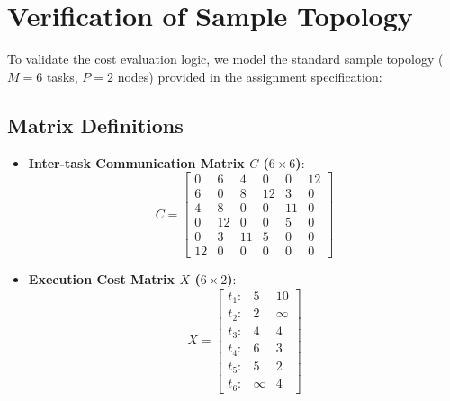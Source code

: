 \documentclass[12pt]{article}
\begin{document}
\section{Verification of Sample Topology}
To validate the cost evaluation logic, we model the standard sample topology ($M = 6$ tasks, $P = 2$ nodes) provided in the assignment specification:

\subsection{Matrix Definitions}
\begin{itemize}
    \item \textbf{Inter-task Communication Matrix $C$ ($6 \times 6$)}:
    \begin{equation*}
    C = \begin{bmatrix}
    0 & 6 & 4 & 0 & 0 & 12 \\
    6 & 0 & 8 & 12 & 3 & 0 \\
    4 & 8 & 0 & 0 & 11 & 0 \\
    0 & 12 & 0 & 0 & 5 & 0 \\
    0 & 3 & 11 & 5 & 0 & 0 \\
    12 & 0 & 0 & 0 & 0 & 0
    \end{bmatrix}
    \end{equation*}

    \item \textbf{Execution Cost Matrix $X$ ($6 \times 2$)}:
    \begin{equation*}
    X = \begin{bmatrix}
    t_1: & 5 & 10 \\
    t_2: & 2 & \infty \\
    t_3: & 4 & 4 \\
    t_4: & 6 & 3 \\
    t_5: & 5 & 2 \\
    t_6: & \infty & 4
    \end{bmatrix}
    \end{equation*}
\end{itemize}
\end{document}
